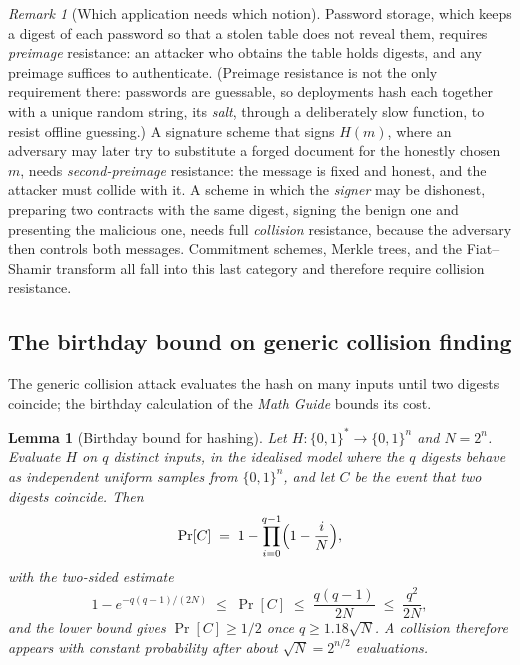 \documentclass[11pt,a4paper]{article}
\newtheorem{lemma}[theorem]{Lemma}
\theoremstyle{definition}
\theoremstyle{remark}
\newtheorem{remark}[theorem]{Remark}
\begin{document}
\begin{remark}[Which application needs which notion]
\label{hash:rem:which-notion}
Password storage, which keeps a digest of each password so that a
stolen table does not reveal them, requires \emph{preimage}
resistance: an attacker who obtains the table holds digests, and any
preimage suffices to authenticate. (Preimage resistance is not the
only requirement there: passwords are guessable, so deployments hash each
together with a unique random string, its \emph{salt}, through a
deliberately slow function, to resist offline guessing.) A signature
scheme that signs \(H(m)\), where an adversary may later try to
substitute a forged document for the honestly chosen \(m\), needs
\emph{second-preimage} resistance: the message is fixed and honest,
and the attacker must collide with it. A scheme in which the
\emph{signer} may be dishonest, preparing two contracts with the same
digest, signing the benign one and presenting the malicious one, needs
full \emph{collision} resistance, because the adversary then controls
both messages. Commitment schemes, Merkle trees, and the Fiat--Shamir
transform all fall into this last category and therefore require
collision resistance.
\end{remark}

\subsection{The birthday bound on generic collision finding}
\label{hash:subsec:birthday}

The generic collision attack evaluates the hash on many inputs until
two digests coincide; the birthday calculation of the
\emph{Math Guide} bounds its cost.

\begin{lemma}[Birthday bound for hashing]\label{hash:lem:birthday}
Let \(H \colon \{0,1\}^{*} \to \{0,1\}^{n}\) and \(N = 2^{n}\).
Evaluate \(H\) on \(q\) distinct inputs, in the idealised model where
the \(q\) digests behave as independent uniform samples from
\(\{0,1\}^{n}\), and let \(C\) be the event that two digests coincide.
Then
\[
\Pr[C] \;=\; 1 - \prod_{i=0}^{q-1}\Bigl(1 - \frac{i}{N}\Bigr),
\]
with the two-sided estimate
\[
1 - e^{-q(q-1)/(2N)} \;\le\; \Pr[C] \;\le\;
\frac{q(q-1)}{2N} \;\le\; \frac{q^{2}}{2N},
\]
and the lower bound gives \(\Pr[C] \ge 1/2\) once
\(q \ge 1.18\sqrt{N}\). A collision therefore appears with constant
probability after about \(\sqrt{N} = 2^{n/2}\) evaluations.
\end{lemma}
\end{document}

